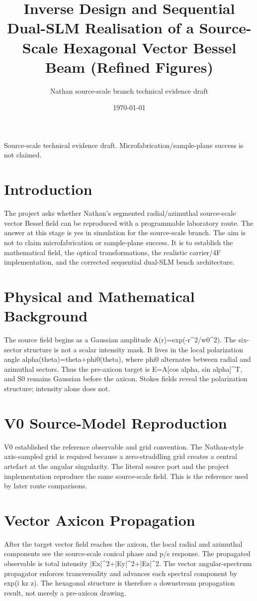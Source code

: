 \documentclass[11pt]{article}
\title{Inverse Design and Sequential Dual-SLM Realisation of a Source-Scale Hexagonal Vector Bessel Beam (Refined Figures)}
\author{Nathan source-scale branch technical evidence draft}
\date{\today}
\begin{document}
\maketitle
\noindent Source-scale technical evidence draft. Microfabrication/sample-plane success is not claimed.

\section{Introduction}
The project asks whether Nathan's segmented radial/azimuthal source-scale vector Bessel field can be reproduced with a programmable laboratory route. The answer at this stage is yes in simulation for the source-scale branch. The aim is not to claim microfabrication or sample-plane success. It is to establish the mathematical field, the optical transformations, the realistic carrier/4F implementation, and the corrected sequential dual-SLM bench architecture.

\section{Physical and Mathematical Background}
The source field begins as a Gaussian amplitude A(r)=exp(-r\^{}2/w0\^{}2). The six-sector structure is not a scalar intensity mask. It lives in the local polarization angle alpha(theta)=theta+phi0(theta), where phi0 alternates between radial and azimuthal sectors. Thus the pre-axicon target is E=A[cos alpha, sin alpha]\^{}T, and S0 remains Gaussian before the axicon. Stokes fields reveal the polarization structure; intensity alone does not.

\section{V0 Source-Model Reproduction}
V0 established the reference observable and grid convention. The Nathan-style axis-sampled grid is required because a zero-straddling grid creates a central artefact at the angular singularity. The literal source port and the project implementation reproduce the same source-scale field. This is the reference used by later route comparisons.

\section{Vector Axicon Propagation}
After the target vector field reaches the axicon, the local radial and azimuthal components see the source-scale conical phase and p/s response. The propagated observable is total intensity |Ex|\^{}2+|Ey|\^{}2+|Ez|\^{}2. The vector angular-spectrum propagator enforces transversality and advances each spectral component by exp(i kz z). The hexagonal structure is therefore a downstream propagation result, not merely a pre-axicon drawing.
\end{document}
